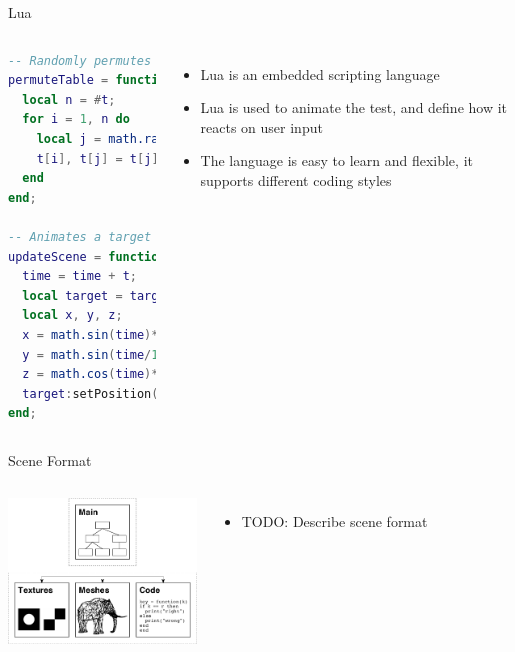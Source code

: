 \documentclass[12pt,ucs,hyperref={pdftext}]{beamer}
\newlength{\columnleft}
\newlength{\columnright}
\begin{document}
\begin{frame}[fragile]{Lua}
\begin{columns}

\column{\columnleft}

\begin{lstlisting}[language=lua]
-- Randomly permutes a table
permuteTable = function (t)
  local n = #t;
  for i = 1, n do
    local j = math.random(i,n);
    t[i], t[j] = t[j], t[i];
  end
end;

-- Animates a target
updateScene = function (t)
  time = time + t;
  local target = targets[2];
  local x, y, z;
  x = math.sin(time)*3-1;
  y = math.sin(time/10)*2;
  z = math.cos(time)*2;
  target:setPosition({x,y,z});
end;
\end{lstlisting}

\column{\columnright}
\begin{itemize}%
\item Lua is an embedded scripting language
\item Lua is used to animate the test, and define how it reacts on user input
\item The language is easy to learn and flexible, it supports different coding styles
\end{itemize}

\end{columns}
\end{frame}

\begin{frame}{Scene Format}
\begin{columns}

\column{\columnleft}

\begin{center}
\includegraphics[width=5cm]{media/document2.pdf}
\end{center}

\column{\columnright}
\begin{itemize}%
\item TODO: Describe scene format
\end{itemize}

\end{columns}
\end{frame}
\end{document}
